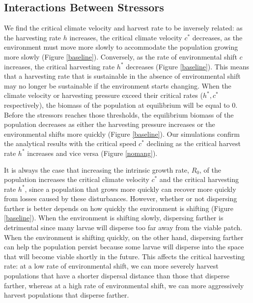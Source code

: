 \documentclass[12pt,english]{article}
\begin{document}
\begin{spacing}{1.9}
\begin{flushleft}
\subsection{Interactions Between Stressors }
We find the critical climate velocity and harvest  rate to be inversely related: as the harvesting rate $h$ increases, the critical climate velocity $c^*$ decreases, as the environment must move more slowly to accommodate the population growing more slowly (Figure \ref{baseline}). %
Conversely, as the rate of environmental shift $c$ increases, the critical harvesting rate $h^*$ decreases (Figure  \ref{baseline}). This means that a harvesting rate that is sustainable in the absence of environmental shift may no longer be sustainable if the environment starts changing. When the climate velocity or harvesting pressure exceed their critical rates ($h^*, c^*$ respectively), the biomass of the population at equilibrium will be equal to $0$.  Before the stressors reaches those thresholds, the equilibrium biomass of the population decreases as either the harvesting pressure increases or the environmental shifts more quickly (Figure \ref{baseline}). Our simulations confirm the analytical results with the critical speed $c^*$ declining as the critical harvest rate $h^*$ increases and vice versa (Figure \ref{nomang}).

It is always the case that increasing the intrinsic growth rate, $R_0$, of the population increases the critical climate velocity $c^*$ and the critical harvesting rate $h^*$, since a population that grows more quickly can recover more quickly from losses caused by these disturbances. However, whether or not dispersing farther is better depends on how quickly the environment is shifting (Figure \ref{baseline}). When the environment is shifting slowly, dispersing farther is detrimental since many larvae will disperse too far away from the viable patch. When the environment is shifting quickly, on the other hand, dispersing farther can help the population persist because some larvae will disperse into the space that will become viable shortly in the future.  This affects the critical harvesting rate: at a low rate of environmental shift, we can more severely harvest populations that have a shorter dispersal distance than those that disperse farther, whereas at a high rate of environmental shift, we can more aggressively harvest populations that disperse farther.


\end{flushleft}
\end{spacing}
\end{document}
